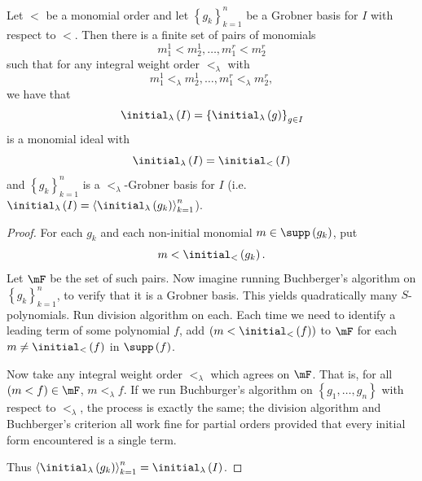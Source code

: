 \documentclass[co439]{subfiles}
\begin{document}
    \begin{theorem}{}
        Let $<$ be a monomial order and let $\left\lbrace g_k \right\rbrace^{n}_{k=1}$ be a Grobner basis for $I$ with respect to $<$. Then there is a finite set of pairs of monomials
        \begin{equation*}
            m_1^1 < m_2^1 , \ldots, m_1^r<m_2^r
        \end{equation*}
        such that for any integral weight order $<_{\lambda}$ with
        \begin{equation*}
            m_1^1 <_{\lambda} m_2^1 , \ldots, m_1^r<_{\lambda}m_2^r,
        \end{equation*}
        we have that
        \begin{equation*}
            \initial_{\lambda}\left( I \right) = \left\lbrace \initial_{\lambda}\left( g \right) \right\rbrace^{}_{g\in I}
        \end{equation*}
        is a monomial ideal with
        \begin{equation*}
            \initial_{\lambda}\left( I \right) = \initial_{<}\left( I \right)
        \end{equation*}
        and $\left\lbrace g_k \right\rbrace^{n}_{k=1}$ is a $<_{\lambda}$-Grobner basis for $I$ (i.e. $\initial_{\lambda}\left( I \right) = \left< \initial_{\lambda}\left( g_k \right) \right>^n_{k=1}$).
    \end{theorem}

    \begin{proof}
        For each $g_k$ and each non-initial monomial $m\in\supp\left( g_k \right)$, put
        \begin{equation*}
            m < \initial_{<}\left( g_k \right).
        \end{equation*}
        Let $\mF$ be the set of such pairs. Now imagine running Buchberger's algorithm on $\left\lbrace g_k \right\rbrace^{n}_{k=1}$, to verify that it is a Grobner basis. This yields quadratically many $S$-polynomials. Run division algorithm on each. Each time we need to identify a leading term of some polynomial $f$, add $\left( m<\initial_{<}\left( f \right) \right)$ to $\mF$ for each $m\neq\initial_<\left( f \right)$ in $\supp\left( f \right)$.

        Now take any integral weight order $<_{\lambda}$ which agrees on $\mF$. That is, for all $\left( m<f \right)\in\mF$, $m<_{\lambda}f$. If we run Buchburger's algorithm on $\left\lbrace g_1,\ldots,g_n \right\rbrace$ with respect to $<_{\lambda}$, the process is exactly the same; the division algorithm and Buchberger's criterion all work fine for partial orders provided that every initial form encountered is a single term.

        Thus $\left< \initial_{\lambda}\left( g_k \right) \right>^n_{k=1} = \initial_{\lambda}\left( I \right)$. 
    \end{proof}
\end{document}
